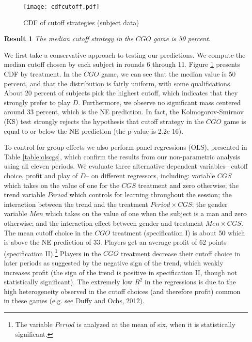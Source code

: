 \documentclass[12pt,english]{article}
\begin{document}
\begin{center}
\begin{figure}[ht]
\centering{}%
\texttt{[image: cdfcutoff.pdf]}%
\caption{CDF of cutoff strategies (subject data) \\ } 
\label{fig:allcutoff}
\end{figure}
\par\end{center}

\noindent \textbf{Result 1}
\textit{The median cutoff strategy in the $CGO$ game is 50 percent.}

We first take a conservative approach to testing our predictions. We compute the median cutoff chosen by each subject in rounds 6 through 11. Figure  \ref{fig:allcutoff} presents CDF by treatment. In the $CGO$ game, we can see that the median value is 50 percent, and that the distribution is fairly uniform, with some qualifications. About 20 percent of subjects pick the highest cutoff, which indicates that they strongly prefer to play $D$. Furthermore, we observe no significant mass centered around 33 percent, which is the NE prediction. In fact, the Kolmogorov-Smirnov (KS) test strongly rejects the hypothesis that cutoff strategy in the $CGO$ game is equal to or below the NE prediction (the p-value is 2.2e-16).

To control for group effects we also perform panel regressions (OLS), presented in Table \ref{table:olscgs}, which confirm the results from our non-parametric analysis using all eleven periods. We evaluate three alternative dependent variables-- cutoff choice, profit and play of $D$--  on different regressors, including: variable $CGS$ which takes on the value of one for the $CGS$ treatment and zero otherwise; the trend variable $Period$ which controls for learning throughout the session; the interaction between the trend and the treatment $Period \times CGS$; the gender variable $Men$ which takes on the value of one when the subject is a man and zero otherwise; and the interaction effect between gender and treatment $Men \times CGS$. The mean cutoff choice in the $CGO$ treatment (specification I) is about 50 which is above the NE prediction of 33. Players get an average profit of 62 points (specification II).\footnote{The variable $Period$ is analyzed at the mean of six, when it is statistically significant.} Players in the $CGO$ treatment decrease their cutoff choice in later periods as suggested by the negative sign of the trend, which weakly increases profit (the sign of the trend is positive in specification II, though not statistically significant). The extremely low $R^2$ in the regressions is due to the high heterogeneity observed in the cutoff choices (and therefore profit) common in these games (e.g. see Duffy and Ochs, 2012).\\
\end{document}
